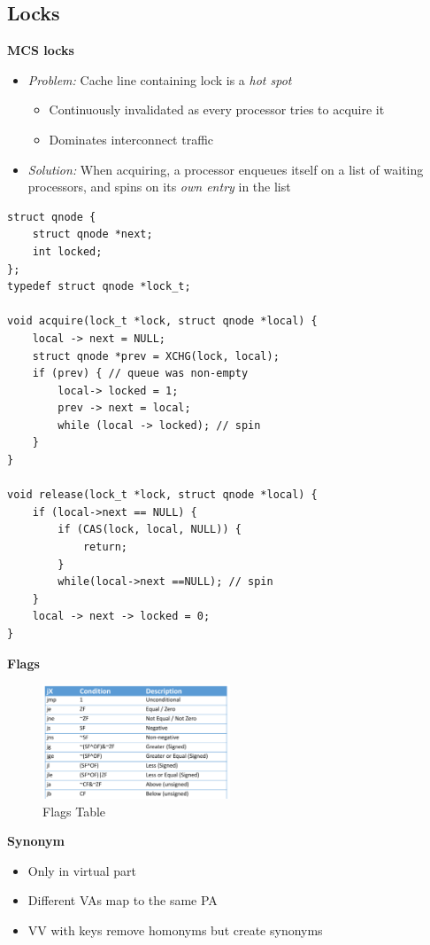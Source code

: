 \documentclass{article}
\begin{document}
\subsection{Locks}

\textbf{MCS locks}
\begin{itemize}
    \item \textit{Problem:} Cache line containing lock is a \textit{hot spot}
    \begin{itemize}
        \item Continuously invalidated as every processor tries to acquire it
        \item Dominates interconnect traffic
    \end{itemize}
    \item \textit{Solution:} When acquiring, a processor enqueues itself on a list of waiting processors, and spins on its \textit{own entry} in the list
\end{itemize}

\begin{verbatim}
struct qnode {
    struct qnode *next;
    int locked;
};
typedef struct qnode *lock_t;

void acquire(lock_t *lock, struct qnode *local) {
    local -> next = NULL;
    struct qnode *prev = XCHG(lock, local);
    if (prev) { // queue was non-empty
        local-> locked = 1;
        prev -> next = local;
        while (local -> locked); // spin
    }
}

void release(lock_t *lock, struct qnode *local) {
    if (local->next == NULL) {
        if (CAS(lock, local, NULL)) {
            return;
        }
        while(local->next ==NULL); // spin
    }
    local -> next -> locked = 0;
}
\end{verbatim}

\textbf{Flags}
\begin{figure}[h]
    \centering
    \includegraphics[width=0.5\textwidth]{flag_table.png}
    \caption{Flags Table}
\end{figure}

\textbf{Synonym}
\begin{itemize}
    \item Only in virtual part
    \item Different VAs map to the same PA
    \item VV with keys remove homonyms but create synonyms
\end{itemize}
\end{document}
